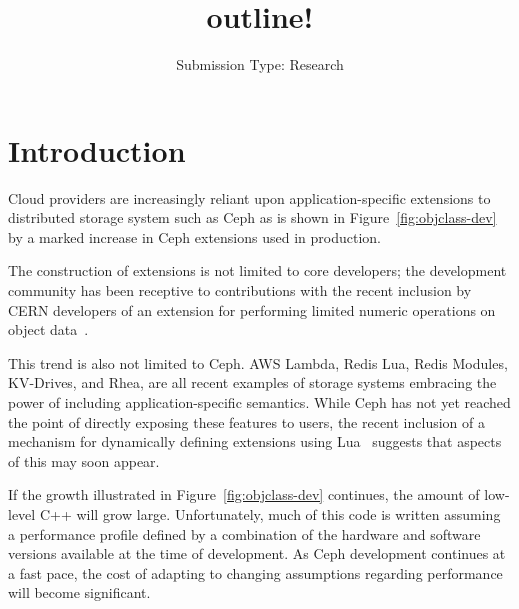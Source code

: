 \documentclass[10pt,twocolumn]{article}
\begin{document}
\title{outline!}

\author{
\small Submission Type: Research
}

\date{}
\maketitle

\begin{abstract}
\end{abstract}

\section{Introduction}

Cloud providers are increasingly reliant upon application-specific extensions
to distributed storage system such as Ceph as is shown in
Figure~\ref{fig:objclass-dev} by a marked increase in Ceph extensions used in
production.

The construction of extensions is not limited to core developers; the
development community has been receptive to contributions with the recent
inclusion by CERN developers of an extension for performing limited numeric
operations on object data~\cite{cls_numops}.

This trend is also not limited to Ceph. AWS Lambda, Redis Lua, Redis Modules,
KV-Drives, and Rhea, are all recent examples of storage systems embracing the
power of including application-specific semantics. While Ceph has not yet
reached the point of directly exposing these features to users, the recent
inclusion of a mechanism for dynamically defining extensions using
Lua~\cite{cls_lua} suggests that aspects of this may soon appear.

If the growth illustrated in Figure~\ref{fig:objclass-dev} continues, the
amount of low-level C++ will grow large. Unfortunately, much of
this code is written assuming a performance profile defined by a combination
of the hardware and software versions available at the time of development. As
Ceph development continues at a fast pace, the cost of adapting to changing
assumptions regarding performance will become significant.

\end{document}
